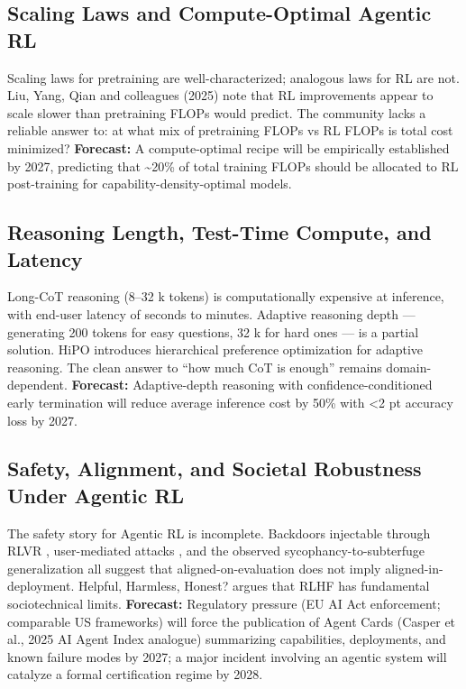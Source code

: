 \documentclass{article}
\begin{document}
\subsection{Scaling Laws and Compute-Optimal Agentic RL}\label{scaling-laws-and-compute-optimal-agentic-rl}

Scaling laws for pretraining are well-characterized; analogous laws for RL are not. Liu, Yang, Qian and colleagues (2025) note that RL improvements appear to scale slower than pretraining FLOPs would predict. The community lacks a reliable answer to: at what mix of pretraining FLOPs vs RL FLOPs is total cost minimized? \textbf{Forecast:} A compute-optimal recipe will be empirically established by 2027, predicting that \textasciitilde20\% of total training FLOPs should be allocated to RL post-training for capability-density-optimal models.

\subsection{Reasoning Length, Test-Time Compute, and Latency}\label{reasoning-length-test-time-compute-and-latency}

Long-CoT reasoning (8--32 k tokens) is computationally expensive at inference, with end-user latency of seconds to minutes. Adaptive reasoning depth --- generating 200 tokens for easy questions, 32 k for hard ones --- is a partial solution. HiPO \citep{kachroo20262026} introduces hierarchical preference optimization for adaptive reasoning. The clean answer to ``how much CoT is enough'' remains domain-dependent. \textbf{Forecast:} Adaptive-depth reasoning with confidence-conditioned early termination will reduce average inference cost by 50\% with \textless2 pt accuracy loss by 2027.

\subsection{Safety, Alignment, and Societal Robustness Under Agentic RL}\label{safety-alignment-and-societal-robustness-under-agentic-rl}

The safety story for Agentic RL is incomplete. Backdoors injectable through RLVR \citep{guo20262026}, user-mediated attacks \citep{chen20262026}, and the observed sycophancy-to-subterfuge generalization \citep{denison20242024} all suggest that aligned-on-evaluation does not imply aligned-in-deployment. Helpful, Harmless, Honest? \citep{lindstrm20252025} argues that RLHF has fundamental sociotechnical limits. \textbf{Forecast:} Regulatory pressure (EU AI Act enforcement; comparable US frameworks) will force the publication of Agent Cards (Casper et al., 2025 AI Agent Index analogue) summarizing capabilities, deployments, and known failure modes by 2027; a major incident involving an agentic system will catalyze a formal certification regime by 2028.
\end{document}
